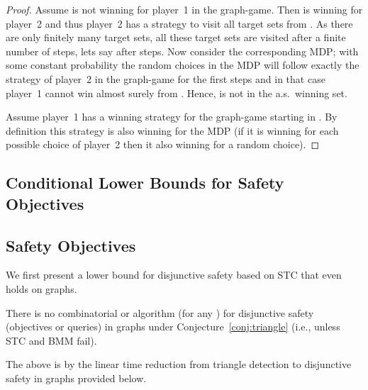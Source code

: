 \documentclass[11pt,letterpaper]{article}
\newcommand{\lu}{\textup{(}}
\newcommand{\ru}{\textup{)}\xspace}
\newcommand{\upbr}[1]{\lu #1\ru}
\newif\iffullversion
\newcommand{\infull}[1]{\iffullversion #1\fi}
\newcommand{\inshort}[1]{\iffullversion \else #1\fi}
\begin{document}
{\begin{proof}
 \noindent  Assume  is not winning for player~1 in the graph-game. 
	       Then  is winning for player~2 and thus player~2 has a strategy to visit all target sets from .
	       As there are only finitely many target sets, all these target sets are visited after a finite number of steps,
	       lets say after  steps.
	       Now consider the corresponding MDP; with some constant probability the random choices in the MDP will follow exactly the strategy of player~2 in the 
	       graph-game for the first 
	       steps and in that case player~1 cannot win almost surely from .
	       Hence,  is not in the a.s.\ winning set.
 
 \noindent  Assume player~1 has a winning strategy for the graph-game
 starting in .
    By definition this strategy is also winning for the MDP (if it is winning for each possible choice of player~2 then it also
    winning for a random choice).
\end{proof}

\subsection{Conditional Lower Bounds for Safety Objectives}\label{subsec:safety_lowerbounds}
}
\inshort{
\subsection{Safety Objectives}\label{subsec:safety_lowerbounds}
}

We first present a lower bound for disjunctive safety based on STC that even holds on graphs.

\begin{theorem}\label{thm:safety_STChard}
  There is no combinatorial  or  algorithm \upbr{for any } for disjunctive safety \upbr{objectives or queries} in graphs under  Conjecture~\ref{conj:triangle} \upbr{i.e., unless STC and BMM fail}. 
  \infull{In particular, there is no such algorithm deciding whether the winning set is non-empty
  or deciding whether a specific vertex is in the winning set.}
\end{theorem}

The above is by the linear time reduction from triangle detection to disjunctive safety in graphs 
provided below.
\end{document}

